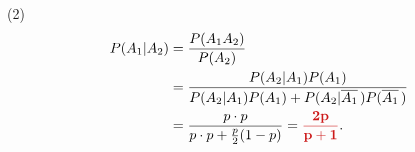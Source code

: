 \documentclass[11pt, UTF8]{ctexart}
\newcommand{\Prob}{P}
\newcommand{\comp}[1]{\overline{#1}\mskip 3mu}
\newcommand{\ans}[1]{\mathbf{\color{fred}#1}}
\begin{document}
(2)
\begin{align*}
    \Prob(A_1 | A_2) &= \frac{\Prob(A_1 A_2)}{\Prob(A_2)} \\
                     &= \frac{\Prob(A_2 | A_1)\Prob(A_1)}{\Prob(A_2 | A_1)\Prob(A_1) + \Prob(A_2 | \comp{A_1})\Prob(\comp{A_1})} \\
                     &= \frac{p \cdot p}{p \cdot p + \frac{p}{2}(1-p)} = \ans{\frac{2p}{p+1}}.
\end{align*}

\vspace{1.5em}
\end{document}
